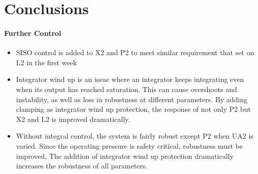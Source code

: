 \documentclass[11pt]{article}
\begin{document}
\section{Conclusions}

\paragraph{Further Control}
\begin{itemize}
    \item SISO control is added to X2 and P2 to meet similar requirement that set on L2 in the first week
    \item Integrator wind up is an issue where an integrator keeps integrating even when its output has reached saturation. This can cause overshoots and instability, as well as loss in robustness at different parameters. By adding clamping as integrator wind up protection, the response of not only P2 but X2 and L2 is improved dramatically.
    \item Without integral control, the system is fairly robust except P2 when UA2 is varied. Since the operating pressure is safety critical, robustness must be improved, The addition of integrator wind up protection  dramatically increases the robustness of all parameters.
\end{itemize}
\end{document}
